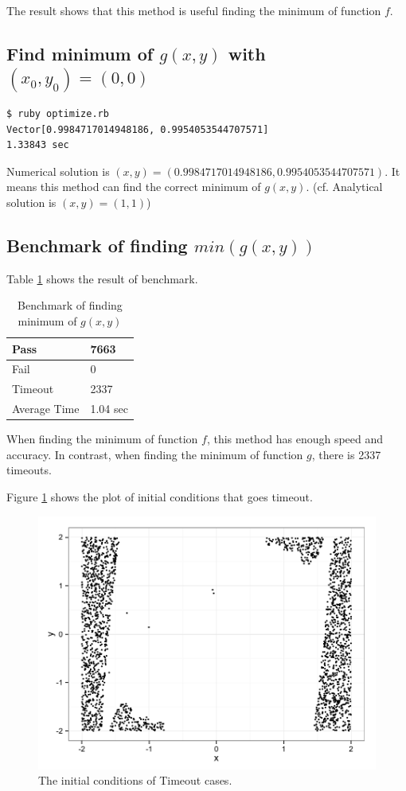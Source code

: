 \documentclass[a4paper,titlepage]{article}
\begin{document}
  The result shows that this method is useful finding the minimum of function $f$.

  \subsection{Find minimum of $g(x,y)$ with $(x_0, y_0)=(0,0)$}
  \begin{verbatim}
$ ruby optimize.rb
Vector[0.9984717014948186, 0.9954053544707571]
1.33843 sec\end{verbatim}

  Numerical solution is $(x,y) = (0.9984717014948186, 0.9954053544707571)$. It means this method can find the correct minimum of $g(x,y)$.
  (cf. Analytical solution is $(x,y)=(1,1)$)

  \subsection{Benchmark of finding $min(g(x,y))$}
  Table \ref{tb:benchmark-g} shows the result of benchmark.

  \begin{table}[htbp]
    \centering
    \begin{tabular}{ll}\\\hline
      Pass & 7663 \\\hline
      Fail & 0 \\\hline
      Timeout & 2337 \\\hline
      Average Time & 1.04 sec \\\hline
    \end{tabular}
    \caption {Benchmark of finding minimum of $g(x,y)$}
    \label{tb:benchmark-g}
  \end{table}

  When finding the minimum of function $f$, this method has enough speed and accuracy. In contrast,
  when finding the minimum of function $g$, there is 2337 timeouts.

  Figure \ref{fig:timeouts} shows the plot of initial conditions that goes timeout.

  \begin{figure}[htbp]
    \centering
    \includegraphics[width=12cm]{images/timeouts.pdf}
    \caption{The initial conditions of Timeout cases.}
    \label{fig:timeouts}
  \end{figure}
\end{document}

